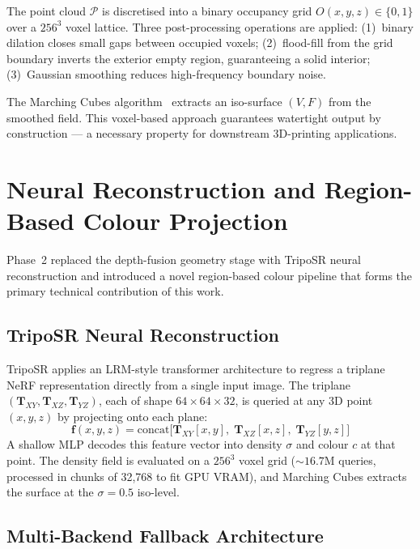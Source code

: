 \documentclass[conference]{IEEEtran}
\begin{document}
The point cloud $\mathcal{P}$ is discretised into a binary occupancy grid
$O(x,y,z) \in \{0,1\}$ over a $256^3$ voxel lattice. Three post-processing operations are applied:
(1)~binary dilation closes small gaps between occupied voxels;
(2)~flood-fill from the grid boundary inverts the exterior empty region, guaranteeing a solid interior;
(3)~Gaussian smoothing reduces high-frequency boundary noise.

The Marching Cubes algorithm~\cite{marching_cubes} extracts an iso-surface $(V, F)$ from the smoothed field.
This voxel-based approach guarantees watertight output by construction — a necessary property for downstream
3D-printing applications.

\section{Neural Reconstruction and Region-Based Colour Projection}

Phase~2 replaced the depth-fusion geometry stage with TripoSR neural reconstruction and introduced a novel
region-based colour pipeline that forms the primary technical contribution of this work.

\subsection{TripoSR Neural Reconstruction}

TripoSR applies an LRM-style transformer architecture to regress a triplane NeRF representation directly from
a single input image. The triplane $(\mathbf{T}_{XY}, \mathbf{T}_{XZ}, \mathbf{T}_{YZ})$, each of shape
$64 \times 64 \times 32$, is queried at any 3D point $(x,y,z)$ by projecting onto each plane:
\begin{equation}
\mathbf{f}(x,y,z) = \text{concat}\bigl[\mathbf{T}_{XY}[x,y], \; \mathbf{T}_{XZ}[x,z], \; \mathbf{T}_{YZ}[y,z]\bigr]
\end{equation}
A shallow MLP decodes this feature vector into density $\sigma$ and colour $c$ at that point. The density field
is evaluated on a $256^3$ voxel grid ($\sim 16.7\text{M}$ queries, processed in chunks of 32,768 to fit GPU
VRAM), and Marching Cubes extracts the surface at the $\sigma = 0.5$ iso-level.

\subsection{Multi-Backend Fallback Architecture}
\end{document}
